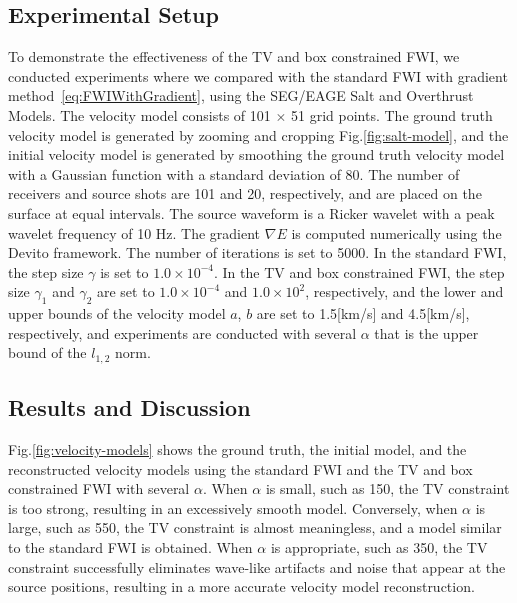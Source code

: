\subsection{Experimental Setup}\label{subsec:experimental-setup}

To demonstrate the effectiveness of the TV and box constrained FWI, we conducted experiments where we compared with the standard FWI with gradient method~\eqref{eq:FWIWithGradient}, using the SEG/EAGE Salt and Overthrust Models.
The velocity model consists of 101 $\times$ 51 grid points.
The ground truth velocity model is generated by zooming and cropping Fig.\ref{fig:salt-model}, and the initial velocity model is generated by smoothing the ground truth velocity model with a Gaussian function with a standard deviation of 80.
The number of receivers and source shots are 101 and 20, respectively, and are placed on the surface at equal intervals.
The source waveform is a Ricker wavelet with a peak wavelet frequency of 10 Hz.
The gradient $\nabla E$ is computed numerically using the Devito framework\cite{devito}.
The number of iterations is set to 5000.
In the standard FWI, the step size $\gamma$ is set to $1.0 \times 10^{-4}$.
In the TV and box constrained FWI, the step size $\gamma_1$ and $\gamma_2$ are set to $1.0 \times 10^{-4}$ and $1.0 \times 10^2$, respectively,
    and the lower and upper bounds of the velocity model $a$, $b$ are set to 1.5[km/s] and 4.5[km/s], respectively,
    and experiments are conducted with several $\alpha$ that is the upper bound of the $l_{1,2}$ norm.


\subsection{Results and Discussion}\label{subsec:results-and-discussion}

Fig.\ref{fig:velocity-models} shows the ground truth, the initial model, and the reconstructed velocity models using the standard FWI and the TV and box constrained FWI with several $\alpha$.
When $\alpha$ is small, such as 150, the TV constraint is too strong, resulting in an excessively smooth model.
Conversely, when $\alpha$ is large, such as 550, the TV constraint is almost meaningless, and a model similar to the standard FWI is obtained.
When $\alpha$ is appropriate, such as 350, the TV constraint successfully eliminates wave-like artifacts and noise that appear at the source positions, resulting in a more accurate velocity model reconstruction.

